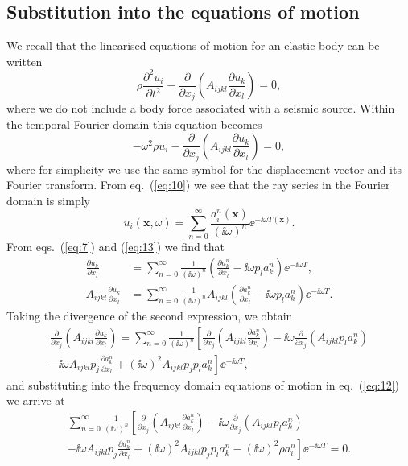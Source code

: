 \subsection*{Substitution into the equations of motion}
We recall that the linearised equations of motion for an elastic body can be written
\begin{equation}
\rho\frac{\partial^{2}u_{i}}{\partial t^{2}}-\frac{\partial}{\partial x_{j}}\left(A_{ijkl}\frac{\partial u_{k}}{\partial x_{l}}\right)=0,
\label{eq:11}
\end{equation}
where we do not include a body force associated with a seismic source. Within the temporal Fourier domain this equation becomes
\begin{equation}
-\omega^{2}\rho u_{i}-\frac{\partial}{\partial x_{j}}\left(A_{ijkl}\frac{\partial u_{k}}{\partial x_{l}}\right)=0,
\label{eq:12}
\end{equation}
where for simplicity we use the same symbol for the displacement vector and its Fourier transform. From eq.~(\ref{eq:10}) we see that the 
ray series in the Fourier domain is simply
\begin{equation}
u_{i}(\mathbf{x},\omega)=\sum_{n=0}^{\infty}\frac{a_{i}^{n}(\mathbf{x})}{(\ii\omega)^{n}}\ee^{-\ii\omega T(\mathbf{x})}.
\label{eq:13}
\end{equation}
From eqs.~(\ref{eq:7}) and (\ref{eq:13}) we find that
\begin{align}
\frac{\partial u_{k}}{\partial x_{l}}&=\sum_{n=0}^{\infty}\frac{1}{(\ii\omega)^{n}}\left(\frac{\partial a_{k}^{n}}{\partial x_{l}}
-\ii\omega p_{l}a_{k}^{n}\right)\ee^{-\ii\omega T}, \label{eq:14}\\
A_{ijkl}\frac{\partial u_{k}}{\partial x_{l}}&=\sum_{n=0}^{\infty}\frac{1}{(\ii\omega)^{n}}A_{ijkl}\left(\frac{\partial a_{k}^{n}}
{\partial x_{l}}-\ii\omega p_{l}a_{k}^{n}\right)\ee^{-\ii\omega T}. \label{eq:15}
\end{align}
Taking the divergence of the second expression, we obtain
\begin{multline}
\frac{\partial}{\partial x_{j}}\left(A_{ijkl}\frac{\partial u_{k}}{\partial x_{l}}\right)=\sum_{n=0}^{\infty}\frac{1}
{(\ii\omega)^{n}}\left[\frac{\partial}{\partial x_{j}}\left(A_{ijkl}\frac{\partial a_{k}^{n}}{\partial x_{l}}\right)
-\ii\omega\frac{\partial}{\partial x_{j}}(A_{ijkl}p_{l}a_{k}^{n}) \right. \\
\left. -\ii\omega A_{ijkl}p_{j}\frac{\partial a_{k}^{n}}{\partial x_{l}}+(\ii\omega)^{2}A_{ijkl}p_{j}p_{l}a_{k}^{n}\right]\ee^{-\ii\omega T},
\label{eq:16}
\end{multline}
and substituting into the frequency domain equations of motion in eq.~(\ref{eq:12}) we arrive at
\begin{multline}
\sum_{n=0}^{\infty}\frac{1}{(\ii\omega)^{n}}\left[\frac{\partial}{\partial x_{j}}\left(A_{ijkl}\frac{\partial a_{k}^{n}}{\partial x_{l}}\right)-\ii\omega\frac{\partial}{\partial x_{j}}(A_{ijkl}p_{l}a_{k}^{n}) \right. \\
\left. -\ii\omega A_{ijkl}p_{j}\frac{\partial a_{k}^{n}}{\partial x_{l}}+(\ii\omega)^{2}A_{ijkl}p_{j}p_{l}a_{k}^{n}-(\ii\omega)^{2}\rho a_{i}^{n}\right]\ee^{-\ii\omega T}=0.
\label{eq:17}
\end{multline}

